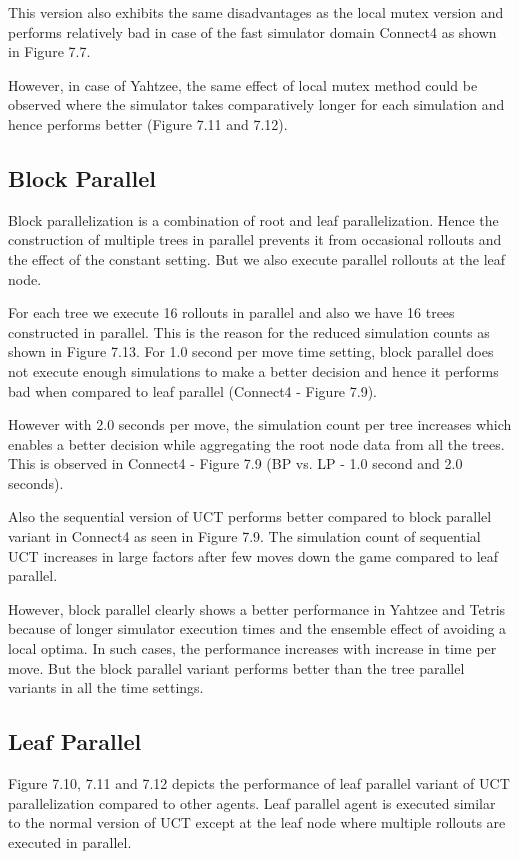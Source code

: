 \documentclass[double,12pt]{beavtex}
\begin{document}
This version also exhibits the same disadvantages as the local mutex version and performs relatively bad in case of the fast simulator domain Connect4 as shown in Figure 7.7. 

However, in case of Yahtzee, the same effect of local mutex method could be observed where the simulator takes comparatively longer for each simulation and hence performs better (Figure 7.11 and 7.12).

\subsection{Block Parallel}
Block parallelization is a combination of root and leaf parallelization. Hence the construction of multiple trees in parallel prevents it from occasional rollouts and the effect of the constant setting. But we also execute parallel rollouts at the leaf node. 

For each tree we execute 16 rollouts in parallel and also we have 16 trees constructed in parallel. This is the reason for the reduced simulation counts as shown in Figure 7.13. For 1.0 second per move time setting, block parallel does not execute enough simulations to make a better decision and hence it performs bad when compared to leaf parallel (Connect4 - Figure 7.9). 

However with 2.0 seconds per move, the simulation count per tree increases which enables a better decision while aggregating the root node data from all the trees. This is observed in Connect4 - Figure 7.9 (BP vs. LP - 1.0 second and 2.0 seconds). 

Also the sequential version of UCT performs better compared to block parallel variant in Connect4 as seen in Figure 7.9. The simulation count of sequential UCT increases in large factors after few moves down the game compared to leaf parallel. 

However, block parallel clearly shows a better performance in Yahtzee and Tetris because of longer simulator execution times and the ensemble effect of avoiding a local optima. In such cases, the performance increases with increase in time per move. But the block parallel variant performs better than the tree parallel variants in all the time settings.

\subsection{Leaf Parallel}
Figure 7.10, 7.11 and 7.12 depicts the performance of leaf parallel variant of UCT parallelization compared to other agents. Leaf parallel agent is executed similar to the normal version of UCT except at the leaf node where multiple rollouts are executed in parallel. 
\end{document}
